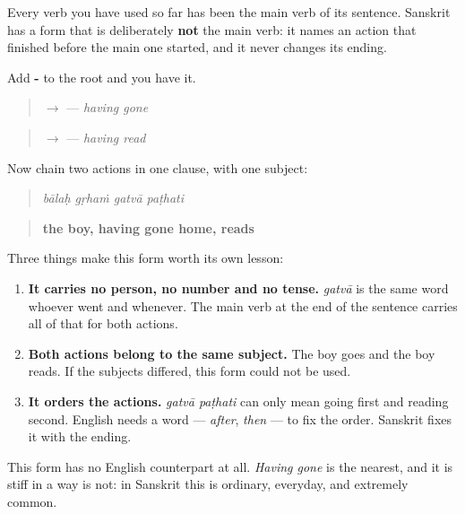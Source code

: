\begin{grammarlens}[title={Grammar Lens: one action finished, the next beginning}]
Every verb you have used so far has been the main verb of its sentence. Sanskrit has a form that is deliberately \textbf{not} the main verb: it names an action that finished before the main one started, and it never changes its ending.

Add \textbf{-} to the root and you have it.

\begin{quote}
\textbf{} $\to$ \textbf{} — \emph{having gone}
\end{quote}

\begin{quote}
\textbf{} $\to$ \textbf{} — \emph{having read}
\end{quote}

Now chain two actions in one clause, with one subject:

\begin{quote}
\textbf{   }
\end{quote}

\begin{quote}
\emph{bālaḥ gṛhaṁ gatvā paṭhati}
\end{quote}

\begin{quote}
\textbf{the boy, having gone home, reads}
\end{quote}

Three things make this form worth its own lesson:

\begin{enumerate}
\raggedright
  \item \textbf{It carries no person, no number and no tense.} \emph{gatvā} is the same word whoever went and whenever. The main verb at the end of the sentence carries all of that for both actions.
  \item \textbf{Both actions belong to the same subject.} The boy goes and the boy reads. If the subjects differed, this form could not be used.
  \item \textbf{It orders the actions.} \emph{gatvā paṭhati} can only mean going first and reading second. English needs a word — \emph{after}, \emph{then} — to fix the order. Sanskrit fixes it with the ending.
\end{enumerate}

This form has no English counterpart at all. \emph{Having gone} is the nearest, and it is stiff in a way \textbf{} is not: in Sanskrit this is ordinary, everyday, and extremely common.
\end{grammarlens}

